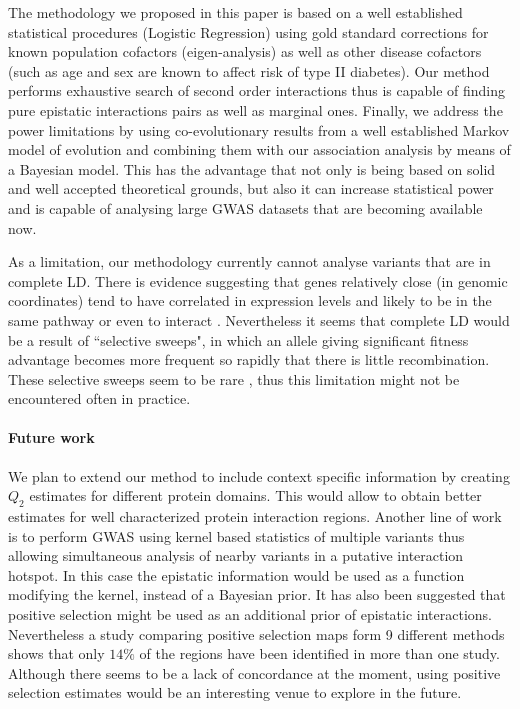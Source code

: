 The methodology we proposed in this paper is based on a well established statistical procedures (Logistic Regression) using gold standard corrections for known population cofactors (eigen-analysis) as well as other disease cofactors (such as age and sex are known to affect risk of type II diabetes).
Our method performs exhaustive search of second order interactions thus is capable of finding pure epistatic interactions pairs as well as marginal ones.
Finally, we address the power limitations by using co-evolutionary results from a well established Markov model of evolution and combining them with our association analysis by means of a Bayesian model.
This has the advantage that not only is being based on solid and well accepted theoretical grounds, but also it can increase statistical power and is capable of analysing large GWAS datasets that are becoming available now.

As a limitation, our methodology currently cannot analyse variants that are in complete LD.
There is evidence suggesting that genes relatively close (in genomic coordinates) tend to have correlated in expression levels and likely to be in the same pathway or even to interact \cite{petkov2005evidence}.
Nevertheless it seems that complete LD would be a result of ``selective sweeps", in which an allele giving significant fitness advantage becomes more frequent so rapidly that there is little recombination.
These selective sweeps seem to be rare \cite{hernandez2011classic}, thus this limitation might not be encountered often in practice.

\paragraph{Future work}
We plan to extend our method to include context specific information by creating $Q_2$ estimates for different protein domains. 
This would allow to obtain better estimates for well characterized protein interaction regions. 
Another line of work is to perform GWAS using kernel based statistics of multiple variants \cite{wu2011rare} thus allowing simultaneous analysis of nearby variants in a putative interaction hotspot. 
In this case the epistatic information would be used as a function modifying the kernel, instead of a Bayesian prior.
It has also been suggested that positive selection might be used as an additional prior of epistatic interactions. 
Nevertheless a study comparing positive selection maps form 9 different methods \cite{akey2009constructing} shows that only $14\%$ of the regions have been identified in more than one study.
Although there seems to be a lack of concordance at the moment, using positive selection estimates would be an interesting venue to explore in the future.
